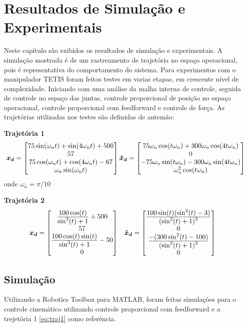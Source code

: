 \chapter{Resultados de Simulação e Experimentais}

Neste capítulo são exibidos os resultados de simulação e experimentais. A simulação mostrada é de um rastreamento de trajetória no espaço operacional, pois é representativa do comportamento do sistema. Para experimentos com o manipulador TETIS foram feitos testes em varias etapas, em crescente nível de complexidade. Iniciando com uma análise da malha interna de controle, seguida de controle no espaço das juntas, controle proporcional de posição no espaço operacional, controle proporcional com feedforward e controle de força. As trajetórias utilizadas nos testes são definidas de antemão:

\textbf{Trajetória 1}
\begin{gather} \label{eq:traj1}
\bm{x_d} = \begin{bmatrix}75 \sin(\omega_n t) + \sin (4 \omega_n t) + 500 \\ 57 \\ 75 \cos(\omega_n t) + \cos(4\omega_n t) -67 \\ \omega_n \sin(\omega_nt) \end{bmatrix}
\bm{\dot{x}_d} = \begin{bmatrix}75\omega_n \cos(t\omega_n) + 300 \omega_n \cos(4t\omega_n) \\
0 \\
-75 \omega_n \sin(t \omega_n) - 300 \omega_n \sin(4t\omega_n) \\
\omega_n^2 \cos(t \omega_n)\end{bmatrix}
\end{gather}
onde $\omega_n = \pi/10$

\textbf{Trajetória 2}
\begin{align}
\bm{x_d} &= \begin{bmatrix} 
\frac{\displaystyle 100 \cos(t)}{\displaystyle \sin^2(t) + 1} + 500 \\
57 \\
\frac{\displaystyle 100\cos(t) \sin(t)}{\displaystyle \sin^2(t) + 1} -50 \\
0
\end{bmatrix} &&
\bm{\dot{x}_d} = \begin{bmatrix}
\frac{\displaystyle 100\sin(t) (\sin^2(t) -3 )}{\displaystyle (\sin^2(t) + 1)^2} \\
0 \\
\frac{\displaystyle -(300 \sin^2(t) - 100)}{\displaystyle (\sin^2(t) + 1)^2} \\
0\end{bmatrix}
\end{align}

\section{Simulação}
Utilizando a Robotics Toolbox \citep{petercorke} para MATLAB\circledR, foram feitas simulações para o controle cinemático utilizando controle proporcional com feedforward e a trejetória 1 \eqref{eq:traj1} como referência.

